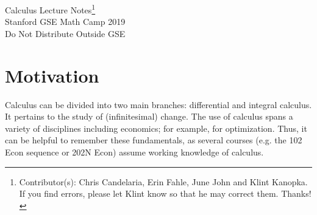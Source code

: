 \documentclass[11pt]{article}
\theoremstyle{definition}
\theoremstyle{remark}
\begin{document}
\begin{center}
{\huge Calculus Lecture Notes\footnote{Contributor(s): Chris Candelaria, Erin Fahle, June John and Klint Kanopka. If you find errors, please let Klint know so that he may correct them. Thanks!}} \\[5pt]
{\Large Stanford GSE Math Camp 2019 \\[5pt]
Do Not Distribute Outside GSE}
\end{center}

\section{Motivation}

Calculus can be divided into two main branches: differential and integral calculus. It pertains to the study of (infinitesimal) change. The use of calculus spans a variety of disciplines including economics; for example, for optimization. Thus, it can be helpful to remember these fundamentals, as several courses (e.g. the 102 Econ sequence or 202N Econ) assume working knowledge of calculus.
\end{document}
